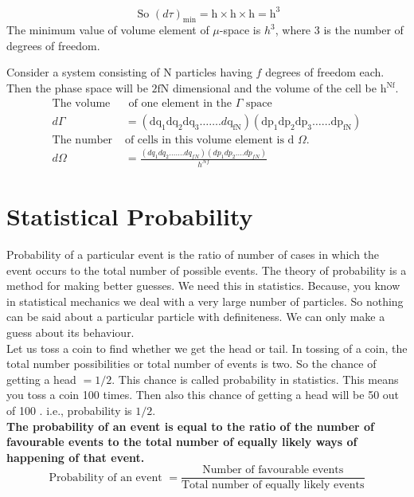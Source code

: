 $$\text{ So }(d \tau)_{\min }=\mathrm{h} \times \mathrm{h} \times \mathrm{h}=\mathrm{h}^{3}$$
The minimum value of volume element of $\mu$-space is $h^{3}$, where 3 is the number of degrees of freedom.\\
\par Consider a system consisting of $\mathrm{N}$ particles having $f$ degrees of freedom each. Then the phase space will be $2 \mathrm{fN}$ dimensional and the volume of the cell be $\mathrm{h}^{\mathrm{Nf}}$.
\begin{align*}
\text{The volume}&\text{ of one element in the $\Gamma$ space}\\
d\Gamma&=\left(\mathrm{dq}_{1} \mathrm{dq}_{2} \mathrm{dq}_{3} \ldots \ldots . d \mathrm{q}_{\mathrm{fN}}\right)\left(\mathrm{dp}_{1} \mathrm{dp}_{2} \mathrm{dp}_{3} \ldots \ldots \mathrm{dp}_{\mathrm{fN}}\right)\\
\text{The number }&\text{of cells in this volume element is d $\Omega$.}
\\
d \Omega&=\frac{\left(d q_{1} d q_{2} \ldots \ldots . d q_{f N}\right)\left(d p_{1} d p_{2} \ldots . d p_{f N}\right)}{h^{N f}}
\end{align*}
\section{Statistical Probability}
Probability of a particular event is the ratio of number of cases in which the event occurs to the total number of possible events. The theory of probability is a method for making better guesses. We need this in statistics. Because, you know in statistical mechanics we deal with a very large number of particles. So nothing can be said about a particular particle with definiteness. We can only make a guess about its behaviour.\\
Let us toss a coin to find whether we get the head or tail. In tossing of a coin, the total number possibilities or total number of events is two. So the chance of getting a head $=1 / 2$. This chance is called probability in statistics. This means you toss a coin 100 times. Then also this chance of getting a head will be 50 out of 100 . i.e., probability is $1 / 2$.\\
\textbf{The probability of an event is equal to the ratio of the number of favourable events to the total number of equally likely ways of happening of that event.}\\
$$\text{Probability of an event }=\frac{\text{Number of favourable events}}{\text{Total number of equally likely events}}$$
